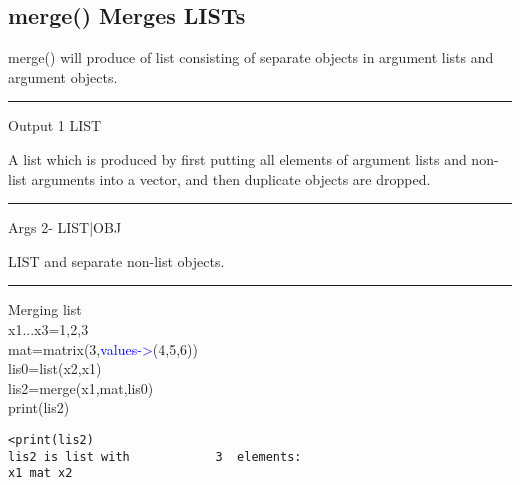 \subsection{\textcolor{VioletRed}{merge}() Merges LISTs}
\label{merge}
\textcolor{VioletRed}{merge}() will produce of list consisting of separate objects
in argument lists and argument objects.
\vspace{0.3cm}
\hrule
\vspace{0.3cm}
\noindent Output \tabto{3cm} 1 \tabto{5cm}  LIST \tabto{7cm}
\begin{changemargin}{3cm}{0cm}
\noindent A list which is produced by first putting all elements of
argument lists and non-list arguments into a vector, and then duplicate objects are dropped.
\end{changemargin}
\vspace{0.3cm}
\hrule
\vspace{0.3cm}
\noindent Args \tabto{3cm} 2- \tabto{5cm}  LIST|OBJ \tabto{7cm}
\begin{changemargin}{3cm}{0cm}
\noindent  LIST and separate non-list objects.
\end {changemargin}
\hrule
\vspace{0.2cm}
\begin{example}[mergex]Merging list\\
\label{mergex}
x1...x3=1,2,3\\
mat=\textcolor{VioletRed}{matrix}(3,\textcolor{blue}{values->}(4,5,6))\\
lis0=\textcolor{VioletRed}{list}(x2,x1)\\
lis2=\textcolor{VioletRed}{merge}(x1,mat,lis0)\\
\textcolor{VioletRed}{print}(lis2)
\color{Green}
\begin{verbatim}
<print(lis2)
lis2 is list with            3  elements:
x1 mat x2
\end{verbatim}
\color{Black}
\end{example}
